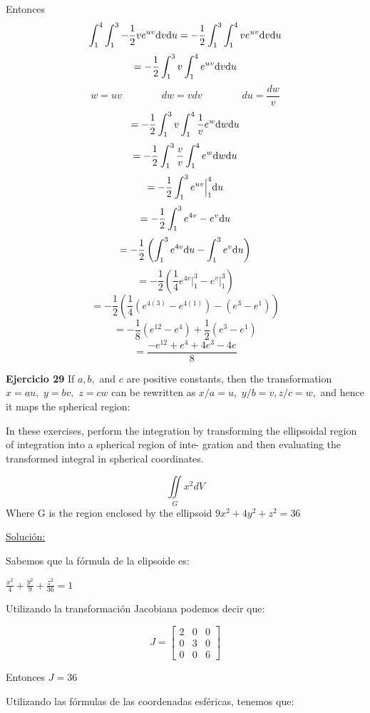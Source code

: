 \documentclass{report}
\newcommand{\s}{\underline{Soluci\'{o}n:}}
\begin{document}
	Entonces 
	\[\int_1^4\int_1^3 -\frac{1}{2}v e^{uv} \text dv \text du 
	   = -\frac{1}{2}\int_1^3\int_1^4 v e^{uv} \text dv \text du\]
	\[ = -\frac{1}{2}\int_1^3v\int_1^4 e^{uv} \text dv \text du\]
	\[w = uv  \qquad \qquad dw = v dv \qquad \qquad du = \frac{dw}{v} \]
	\[ = -\frac{1}{2}\int_1^3v\int_{1}^{4}\frac{1}{v} e^{w} \text dw \text du\]
	\[ = -\frac{1}{2}\int_1^3\frac{v}{v}\int_{1}^{4} e^{w} \text dw \text du\]
	\[ = -\frac{1}{2}\int_1^3e^{uv} \Big|_1^4 \text du\]
	\[ = -\frac{1}{2}\int_1^3e^{4v} -e^{v}\text du\]
	\[ = -\frac{1}{2}\left( \int_1^3e^{4v}\text du -\int_1^3e^{v}\text du\right) \]
	\[ = -\frac{1}{2}\left(\frac{1}{4}e^{4v} \Big|_1^3 - e^{v} \Big|_1^3\right) \]
	\[ = -\frac{1}{2}\left(\frac{1}{4}\left( e^{4(3)} - e^{4(1)} \right) -\left( e^{3} - e^{1}\right)\right)  \]
	\[ = -\frac{1}{8}\left( e^{12} - e^{4} \right) + \frac{1}{2}\left( e^{3} - e^{1}\right) \]
	\[ = \frac{-e^{12} + e^{4} + 4e^{3} - 4e}{8}\]
	
	\textbf{Ejercicio 29} 
	If $a, b,$ and $c$ are positive constants, then the transformation $x = au,$ $y = bv,$ $z = cw$ can be rewritten as $x/a = u,$ $y /b = v, z/c = w,$  and hence it maps the spherical region:
	
	
	In these exercises, perform the integration by transforming the
	ellipsoidal region of integration into a spherical region of inte-
	gration and then evaluating the transformed integral in spherical
	coordinates.
	
	\[\displaystyle \iint \limits_G x^2 dV \]
	Where G is the region enclosed by the ellipsoid $9x^2 + 4y^2 + z^2 = 36 $
	
	\s
	
	Sabemos que la fórmula de la elipsoide es:
	
	$ \frac{x^2}{4} + \frac{y^2}{9} + \frac{z^2}{36} = 1 $
	
	Utilizando la transformación Jacobiana podemos decir que:
	
	\[J =  \begin{bmatrix}
	2 & 0 & 0  \\
	0 & 3 & 0 \\
	0 & 0 & 6
	\end{bmatrix} \]
	
	Entonces $ J = 36 $
	
	Utilizando las fórmulas de las coordenadas esféricas, tenemos que:
	
\end{document}
